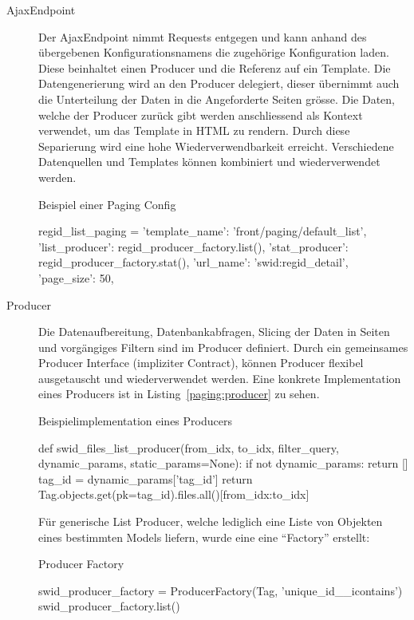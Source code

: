 \begin{description}
	\item [AjaxEndpoint] Der AjaxEndpoint nimmt Requests entgegen und kann anhand
	des übergebenen Konfigurationsnamens die zugehörige Konfiguration laden. Diese
	beinhaltet einen Producer und die Referenz auf ein Template. Die
	Datengenerierung wird an den Producer delegiert, dieser übernimmt auch die
	Unterteilung der Daten in die Angeforderte  Seiten grösse. Die Daten, welche der
	Producer zurück gibt werden anschliessend als Kontext verwendet, um das
	Template in HTML zu rendern. Durch diese Separierung wird eine hohe
	Wiederverwendbarkeit erreicht. Verschiedene Datenquellen und Templates können
	kombiniert und wiederverwendet werden.
\begin{listing}
\caption{Beispiel einer Paging Config}
\begin{pythoncode}
regid_list_paging = {
    'template_name': 'front/paging/default_list',
    'list_producer': regid_producer_factory.list(),
    'stat_producer': regid_producer_factory.stat(),
    'url_name': 'swid:regid_detail',
    'page_size': 50,
}
\end{pythoncode}
\end{listing}

	\item[Producer] Die Datenaufbereitung, Datenbankabfragen, Slicing der Daten in
	Seiten und vorgängiges Filtern sind im Producer definiert. Durch ein
	gemeinsames Producer Interface (impliziter Contract\cite{contracts:2003}),
	können Producer flexibel ausgetauscht und wiederverwendet werden. Eine konkrete
	Implementation eines Producers ist in Listing~\ref{paging:producer} zu sehen.
	
\begin{listing}
\caption{Beispielimplementation eines Producers}
\label{paging:producer}
\begin{pythoncode}
def swid_files_list_producer(from_idx, to_idx, filter_query, dynamic_params, static_params=None):
 if not dynamic_params:
     return []
 tag_id = dynamic_params['tag_id']
 return Tag.objects.get(pk=tag_id).files.all()[from_idx:to_idx]
\end{pythoncode}
\end{listing}
	
	Für generische List Producer, welche lediglich eine Liste von Objekten eines
	bestimmten Models liefern, wurde eine eine \enquote{Factory} erstellt:
	
\begin{listing}
\caption{Producer Factory}
\begin{pythoncode}
swid_producer_factory = ProducerFactory(Tag, 'unique_id__icontains')
swid_producer_factory.list()
\end{pythoncode}
\end{listing}
	

\end{description}

